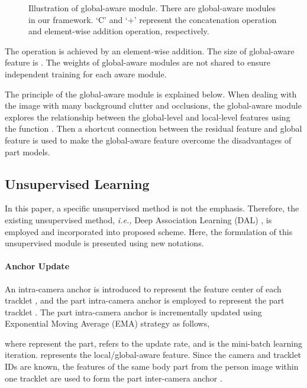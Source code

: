 \documentclass{cta-author}
\begin{document}
	\begin{figure}[!h]
		\caption{Illustration of  global-aware module. There are  global-aware modules in our framework. `C' and `+' represent the concatenation operation and element-wise addition operation, respectively. \label{global-aware-module}} 
	\end{figure}

	The operation  is achieved by an element-wise addition. 
	The size of global-aware feature  is .
	The weights of  global-aware modules are not shared to ensure independent training for each aware module. 
	
	
	The principle of the global-aware module is explained below. When dealing with the image with many background clutter and occlusions, the global-aware module explores the relationship between the global-level and local-level features using the function . Then a shortcut connection between the residual feature  and global feature  is used to make the global-aware feature  overcome the disadvantages of part models. 
	
	\subsection{Unsupervised Learning} \label{unsupervised learning}
	In this paper, a specific unsupervised method is not the emphasis. Therefore, the existing unsupervised method, \textit{i.e.,} Deep Association Learning (DAL) \cite{RN87}, is employed and incorporated into proposed scheme. Here, the formulation of this unsupervised module is presented using new notations.
	
	\paragraph{Anchor Update}
	An intra-camera anchor  is introduced to represent the feature center of each tracklet , and the part intra-camera anchor  is employed to represent the part tracklet . The part intra-camera anchor  is incrementally updated using Exponential Moving Average (EMA) strategy as follows,
	
	where  represent the  part,  refers to the update rate, and  is the mini-batch learning iteration.  represents the local/global-aware feature. Since the camera and tracklet IDs are known, the features of the same body part from the person image within one tracklet  are used to form the part inter-camera anchor .
	
\end{document}
